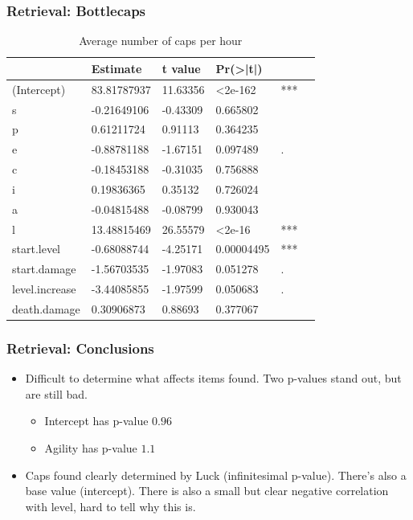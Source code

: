 \documentclass{beamer}
\begin{document}
\begin{frame}
  \frametitle{Retrieval: Bottlecaps}
  \begin{table}
\caption{Average number of caps per hour}
\label{table:caps}
\begin{tabular}{l|lllll}
&Estimate&t value&Pr(>|t|)&\\  
\hline  
(Intercept)&83.81787937  &  11.63356 &<2e-162& ***\\
s &-0.21649106   & -0.43309 &    0.665802 &   \\
p&  0.61211724    & 0.91113 &   0.364235 &   \\
e & -0.88781188    &-1.67151 &   0.097489 &  . \\
c&-0.18453188  &  -0.31035  &  0.756888 &   \\
i& 0.19836365    & 0.35132  &  0.726024 &   \\
a  & -0.04815488  & -0.08799 &   0.930043&    \\
l &   13.48815469   & 26.55579&  <2e-16& ***\\
start.level &  -0.68088744   &  -4.25171 &   0.00004495 & *** \\ 
start.damage& -1.56703535   & -1.97083 &   0.051278 & . \\ 
level.increase & -3.44085855  & -1.97599 &   0.050683 &.  \\ 
death.damage & 0.30906873   &  0.88693  &  0.377067&\\
\hline
\end{tabular}
\end{table}
\end{frame}


\begin{frame}
  \frametitle{Retrieval: Conclusions}
  \begin{itemize}
  \item Difficult to determine what affects items found. Two p-values stand out, but are still bad.
    \begin{itemize}
    \item Intercept has p-value $0.96$
    \item Agility has p-value $1.1$
    \end{itemize}
  \item Caps found clearly determined by Luck (infinitesimal p-value). There's also a base value (intercept). There is also a small but clear negative correlation with level, hard to tell why this is.
  \end{itemize}
\end{frame}
\end{document}
